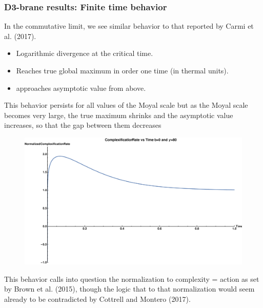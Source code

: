 \documentclass[8pt,aspectratio=169]{beamer}
\begin{document}
\begin{frame}
\frametitle{D3-brane results: Finite time behavior}

In the commutative limit, we see similar behavior to that reported by Carmi et al. (2017).

\begin{minipage}[t]{0.48\linewidth}

\begin{itemize}

\item Logarithmic divergence at the critical time.

\item Reaches true global maximum in order one time (in thermal units).

\item approaches asymptotic value from above.

\end{itemize}

This behavior persists for all values of the Moyal scale  but as the Moyal scale becomes very large, the true maximum shrinks and the asymptotic value increases, so that the gap between them decreases

\end{minipage}
%
\begin{minipage}[t]{0.48\linewidth}

\begin{figure}
    \begin{center}
        \includegraphics[scale=0.15]{FiniteTime1}
    \end{center}
\end{figure}

\end{minipage}
\vspace{5mm}

This behavior calls into question the normalization to complexity = action as set by Brown et al. (2015), though the logic that to that normalization would seem already to be contradicted by Cottrell and Montero (2017).

\end{frame}
\end{document}

